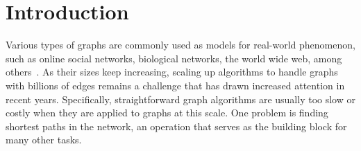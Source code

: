 \section{Introduction}
\label{introduction}

Various types of graphs are commonly used as models for real-world phenomenon, such as online social networks, biological networks, the world wide web, among others~\cite{newman2010networks}. As their sizes keep increasing, scaling up algorithms to handle graphs with billions of edges remains a challenge that has drawn increased attention in recent years. Specifically, straightforward graph algorithms are usually too slow or costly when they are applied to graphs at this scale. One problem is finding shortest paths in the network, an operation that serves as the building block for many other tasks.

